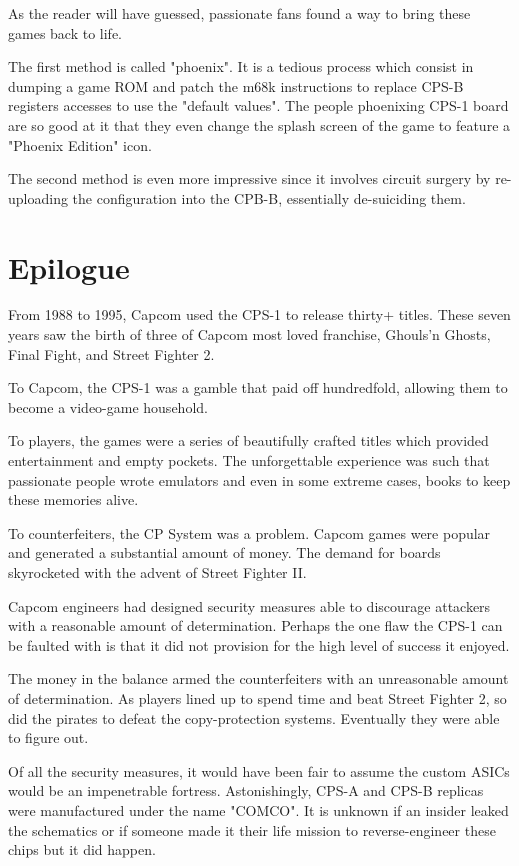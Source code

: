 As the reader will have guessed, passionate fans found a way to bring these games back to life.

The first method is called "phoenix". It is a tedious process which consist in dumping a game ROM and patch the m68k instructions to replace CPS-B registers accesses to use the "default values"\cite{csp1_phoenix}. The people phoenixing CPS-1 board are so good at it that they even change the splash screen of the game to feature a "Phoenix Edition" icon.

The second method is even more impressive since it involves circuit surgery by re-uploading the configuration into the CPB-B, essentially de-suiciding them\cite{arcadeHackerCPS1Desuicide}.






\section{Epilogue}
From 1988 to 1995, Capcom used the CPS-1 to release thirty+ titles. These seven years saw the birth of three of Capcom most loved franchise, Ghouls’n Ghosts, Final Fight, and Street Fighter 2.

To Capcom, the CPS-1 was a gamble that paid off hundredfold, allowing them to become a video-game household. 

To players, the games were a series of beautifully crafted titles which provided entertainment and empty pockets. The unforgettable experience was such that passionate people wrote emulators and even in some extreme cases, books to keep these memories alive. 

To counterfeiters, the CP System was a problem. Capcom games were popular and generated a substantial amount of money. The demand for boards skyrocketed with the advent of Street Fighter II. 

Capcom engineers had designed security measures able to discourage attackers with a reasonable amount of determination. Perhaps the one flaw the CPS-1 can be faulted with is that it did not provision for the high level of success it enjoyed.

The money in the balance armed the counterfeiters with an unreasonable amount of determination. As players lined up to spend time and beat Street Fighter 2, so did the pirates to defeat the copy-protection systems. Eventually they were able to figure out. 


Of all the security measures, it would have been fair to assume the custom ASICs would be an impenetrable fortress. Astonishingly, CPS-A and CPS-B replicas were manufactured under the name "COMCO"\cite{arcadeHackerCPS1}. It is unknown if an insider leaked the schematics or if someone made it their life mission to reverse-engineer these chips but it did happen.

